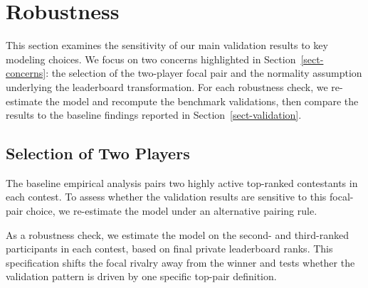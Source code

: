 \documentclass[mnsc]{informs3}
\begin{document}
\section{Robustness}

This section examines the sensitivity of our main validation results to key modeling choices.
We focus on two concerns highlighted in Section~\ref{sect-concerns}: the selection of the two-player focal pair and the normality assumption underlying the leaderboard transformation. For each robustness check, we re-estimate the model and recompute the benchmark validations, then compare the results to the baseline findings reported in Section~\ref{sect-validation}.

\subsection{Selection of Two Players}\label{sect-robust-2players}

The baseline empirical analysis pairs two highly active top-ranked contestants in each contest.
To assess whether the validation results are sensitive to this focal-pair choice, we re-estimate the model under an alternative pairing rule.

As a robustness check, we estimate the model on the second- and third-ranked participants in each contest, based on final private leaderboard ranks.
This specification shifts the focal rivalry away from the winner and tests whether the validation pattern is driven by one specific top-pair definition.
\end{document}
